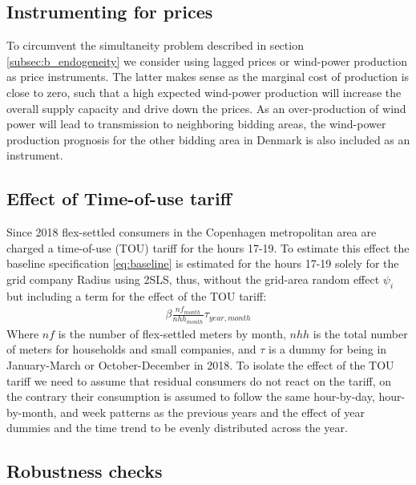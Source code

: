 \subsection{Instrumenting for prices}
\label{subsec:instruments}
To circumvent the simultaneity problem described in section \ref{subsec:b_endogeneity} we consider using lagged prices or wind-power production as price instruments. The latter makes sense as the marginal cost of production is close to zero, such that a high expected wind-power production will increase the overall supply capacity and drive down the prices. As an over-production of wind power will lead to transmission to neighboring bidding areas, the wind-power production prognosis for the other bidding area in Denmark is also included as an instrument.

\subsection{Effect of Time-of-use tariff}
Since 2018 flex-settled consumers in the Copenhagen metropolitan area are charged a time-of-use (TOU) tariff for the hours 17-19. To estimate this effect the baseline specification \ref{eq:baseline} is estimated for the hours 17-19 solely for the grid company Radius using 2SLS, thus, without the grid-area random effect $\psi_i$ but including a term for the effect of the TOU tariff:
\begin{align}
  \beta\frac{nf_{month}}{nhh_{month}}\tau_{year,month}
  \label{eq:tout}
\end{align}
Where $nf$ is the number of flex-settled meters by month, $nhh$ is the total number of meters for households and small companies, and $\tau$ is a dummy for being in January-March or October-December in 2018. To isolate the effect of the TOU tariff we need to assume that residual consumers do not react on the tariff, on the contrary their consumption is assumed to follow the same hour-by-day, hour-by-month, and week patterns as the previous years and the effect of year dummies and the time trend to be evenly distributed across the year.



\subsection{Robustness checks}
\label{subsec:robustness}
